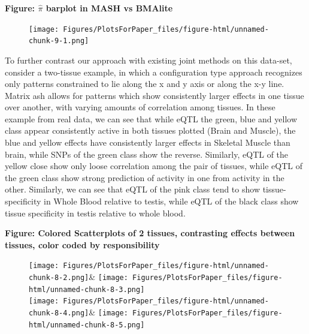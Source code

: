 \textbf{Figure: $\hat{\pi}$ barplot in MASH vs BMAlite}
\newline
\begin{figure}[htbp]
\texttt{[image: Figures/PlotsForPaper\_files/figure-html/unnamed-chunk-9-1.png]}
\end{figure}\newline


To further contrast our approach with existing joint methods on this data-set, consider a two-tissue example, in which a configuration type approach recognizes only patterns constrained to lie along the x and y axis or along the x-y line. Matrix ash allows for patterns which show consistently larger effects in one tissue over another, with varying amounts of correlation among tissues. In these example from real data, we can see that while eQTL  the green, blue and yellow class appear consistently active in both tissues plotted (Brain and Muscle), the blue and yellow effects have consistently larger effects in Skeletal Muscle than brain, while SNPs of the green class show the reverse. Similarly, eQTL of the yellow close show only loose correlation among the pair of tissues, while eQTL of the green class show strong prediction of activity in one from activity in the other.  Similarly, we can see that eQTL of the pink class tend to show tissue-specificity in Whole Blood relative to testis, while eQTL of the black class show tissue specificity in testis relative to whole blood.\newline


\textbf{Figure: Colored Scatterplots of 2 tissues, contrasting effects between tissues, color coded by responsibility}
\newline

\begin{figure}[htbp]
\texttt{[image: Figures/PlotsForPaper\_files/figure-html/unnamed-chunk-8-2.png]}&
\texttt{[image: Figures/PlotsForPaper\_files/figure-html/unnamed-chunk-8-3.png]}\\
\hfill
\texttt{[image: Figures/PlotsForPaper\_files/figure-html/unnamed-chunk-8-4.png]}&
\texttt{[image: Figures/PlotsForPaper\_files/figure-html/unnamed-chunk-8-5.png]}
\end{figure}\newline


